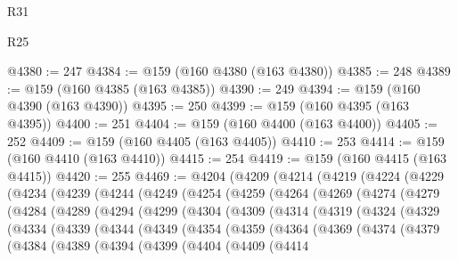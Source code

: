 \begin{lexlean}{R31}
\begin{lexlean}{R25}
\begin{coremodule}
{{{{{{{{{{{{{{{{{{{{{{{{{{{{{{{{{{{{{{{{{{{{{{{{{{{{{{{{{{{{{{{{{{{{{{{{{{{{{{{{{{{{{{{{{{{{{{{{{{{{{{{{{{{{{{{{{{{{{{{{{{{{{{{{{{{{{{{{{{{{{{{{{{{{{{{{{{{{{{{{{{{{{{{{{{{{{{{{{{{{{{{{{{{{{{{{{{{{{{{@4380 := 247
@4384 := @159 (@160 @4380 (@163 @4380))
@4385 := 248
@4389 := @159 (@160 @4385 (@163 @4385))
@4390 := 249
@4394 := @159 (@160 @4390 (@163 @4390))
@4395 := 250
@4399 := @159 (@160 @4395 (@163 @4395))
@4400 := 251
@4404 := @159 (@160 @4400 (@163 @4400))
@4405 := 252
@4409 := @159 (@160 @4405 (@163 @4405))
@4410 := 253
@4414 := @159 (@160 @4410 (@163 @4410))
@4415 := 254
@4419 := @159 (@160 @4415 (@163 @4415))
@4420 := 255
@4469 := @4204
    (@4209
      (@4214
        (@4219
          (@4224
            (@4229
              (@4234
                (@4239
                  (@4244
                    (@4249
                      (@4254
                        (@4259
                          (@4264
                            (@4269
                              (@4274
                                (@4279
                                  (@4284
                                    (@4289
                                      (@4294
                                        (@4299
                                          (@4304
                                            (@4309
                                              (@4314
                                                (@4319
                                                  (@4324
                                                    (@4329
                                                      (@4334
                                                        (@4339
                                                          (@4344
                                                            (@4349
                                                              (@4354
                                                                (@4359
                                                                  (@4364
                                                                    (@4369
                                                                      (@4374
                                                                        (@4379
                                                                          (@4384
                                                                            (@4389
                                                                              (@4394
                                                                                (@4399
                                                                                  (@4404
                                                                                    (@4409
                                                                                      (@4414
}}}}}}}}}}}}}}}}}}}}}}}}}}}}}}}}}}}}}}}}}}}}}}}}}}}}}}}}}}}}}}}}}}}}}}}}}}}}}}}}}}}}}}}}}}}}}}}}}}}}}}}}}}}}}}}}}}}}}}}}}}}}}}}}}}}}}}}}}}}}}}}}}}}}}}}}}}}}}}}}}}}}}}}}}}}}}}}}}}}}}}}}}}}}}}}}}}}}}}}
\end{coremodule}
\end{lexlean}
\end{lexlean}

